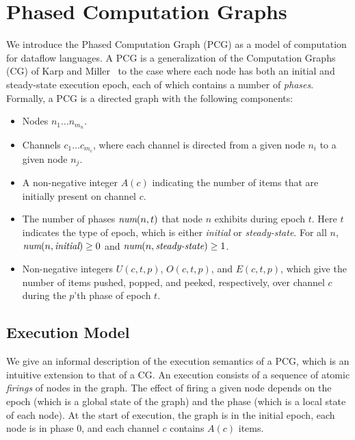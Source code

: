 \section{Phased Computation Graphs}
\label{sec:pcg}

We introduce the Phased Computation Graph (PCG) as a model of
computation for dataflow languages.  A PCG is a generalization of the
Computation Graphs (CG) of Karp and Miller~\cite{KM66} to the case
where each node has both an initial and steady-state execution epoch,
each of which contains a number of {\it phases}.  Formally, a PCG is a
directed graph with the following components:
\begin{itemize}

\item Nodes $n_1 \dots n_{m_n}$.

\item Channels $c_1 \dots c_{m_c}$, where each channel is directed
from a given node $n_i$ to a given node $n_j$.

\item A non-negative integer $A(c)$ indicating the number of items
  that are initially present on channel $c$.

\item The number of phases $\mbox{\it num}(n, t)$ that node $n$ exhibits
during epoch $t$.  Here $t$ indicates the type of epoch, which is
either \textit{initial} or \textit{steady-state}.  For all $n$,
$\mbox{\it num}(n, \mbox{\it initial}) \ge 0$ and $\mbox{\it num}(n, \mbox{\it steady-state})
\ge 1$.

\item Non-negative integers $U(c, t, p)$, $O(c, t, p)$, and $E(c, t,
p)$, which give the number of items pushed, popped, and peeked,
respectively, over channel $c$ during the $p$'th phase of epoch $t$.

\end{itemize}

\subsection{Execution Model}

We give an informal description of the execution semantics of a PCG,
which is an intuitive extension to that of a CG.  An execution
consists of a sequence of atomic {\it firings} of nodes in the graph.
The effect of firing a given node depends on the epoch (which is a
global state of the graph) and the phase (which is a local state of
each node). At the start of execution, the graph is in the initial
epoch, each node is in phase 0, and each channel $c$ contains $A(c)$
items.

